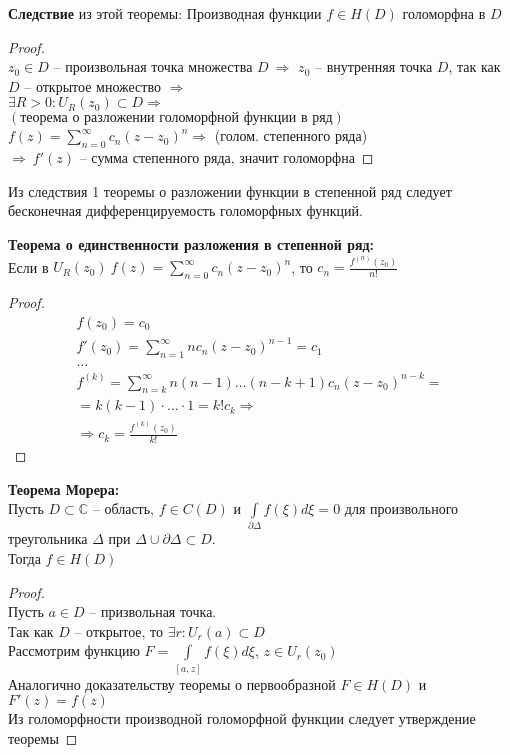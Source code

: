 \textbf{Следствие} из этой теоремы:
Производная функции $f\in H(D)$ голоморфна в $D$
\begin{proof}
    \ \\
    $z_0 \in D$ -- произвольная точка множества $D \ \Rightarrow$ $z_0$ -- внутренняя точка $D$, 
    так как $D$ -- открытое множество $\Rightarrow$ \\[2mm]
    $\exists R > 0: U_R(z_0) \subset D \Rightarrow$ \\[2mm]
    $(\text{теорема о разложении голоморфной функции в ряд})$ \\[2mm] 
    $f(z) = \sum_{n=0}^{\infty}c_n (z - z_0)^n \Rightarrow$ (голом. степенного ряда)\\[2mm]
    $\Rightarrow \ f'(z)$ -- сумма степенного ряда, значит голоморфна 
\end{proof}

Из следствия 1 теоремы о разложении функции в степенной 
ряд следует бесконечная дифференцируемость голоморфных функций.


\textbf{Теорема о единственности разложения в степенной ряд:}\\[2mm]
Если в $U_R(z_0) \ f(z) = \sum_{n=0}^{\infty}c_n (z-z_0)^n$, то $c_n = \frac{f^{(n)}(z_0)}{n!}$


\begin{proof}
	\ \\
	\begin{equation*}
	\begin{gathered}
		f(z_0) = c_0 \\
		f'(z_0) = \sum_{n=1}^{\infty}nc_n(z-z_0)^{n-1} = c_1 \\
		\dots \\
		f^{(k)} = \sum_{n=k}^{\infty} n(n-1)\ldots(n-k+1)c_n(z-z_0)^{n-k} = \\ 
		= k(k-1) \cdot \ldots \cdot 1 = k!c_k \Rightarrow \\ 
		\Rightarrow c_k = \frac{f^{(k)}(z_0)}{k!}
	\end{gathered}
	\end{equation*}
\end{proof}


\textbf{Теорема Морера:}\\[2mm]
Пусть $D \subset \mathbb{C}$ -- область, $f \in C(D)$ и $\int \limits_{\partial \Delta}f(\xi)d\xi = 0$
для произвольного треугольника $\Delta$ при $\Delta \cup \partial \Delta \subset D$. \\[2mm]
Тогда $f \in H(D)$


\begin{proof}
	\ \\
	Пусть $a \in D$ -- призвольная точка. \\[2mm]
	Так как $D$ -- открытое, то $\exists r: U_r(a) \subset D$ \\[2mm]
	Рассмотрим функцию $F = \int \limits_{[a, z]} f(\xi)d\xi$, $z \in U_r(z_0)$ \\[2mm]
	Аналогично доказательству теоремы о первообразной $F \in H(D)$ и $F'(z) = f(z)$ \\[2mm]
	Из голоморфности производной голоморфной функции следует утверждение теоремы
\end{proof}


